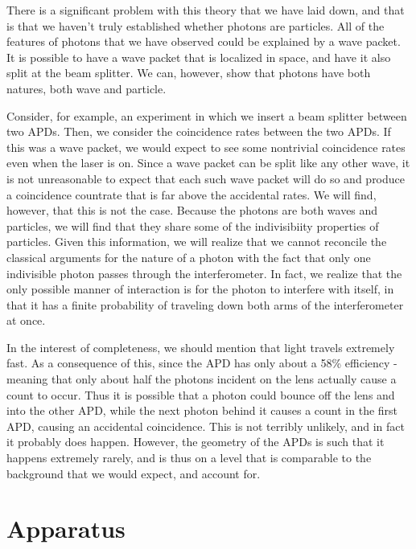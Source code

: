 \documentclass{article}
\begin{document}
	There is a significant problem with this theory that we have laid down, and that is that we haven't truly established whether photons are particles.  All of the features of photons that we have observed could be explained by a wave packet.  It is possible to have a wave packet that is localized in space, and have it also split at the beam splitter.  We can, however, show that photons have both natures, both wave and particle.

	\hspace{.25cm}

	Consider, for example, an experiment in which we insert a beam splitter between two APDs.  Then, we consider the coincidence rates between the two APDs.  If this was a wave packet, we would expect to see some nontrivial coincidence rates even when the laser is on.  Since a wave packet can be split like any other wave, it is not unreasonable to expect that each such wave packet will do so and produce a coincidence countrate that is far above the accidental rates.  We will find, however, that this is not the case.  Because the photons are both waves and particles, we will find that they share some of the indivisibiity properties of particles.  Given this information, we will realize that we cannot reconcile the classical arguments for the nature of a photon with the fact that only one indivisible photon passes through the interferometer.  In fact, we realize that the only possible manner of interaction is for the photon to interfere with itself, in that it has a finite probability of traveling down both arms of the interferometer at once.

	\hspace{.25cm}

	In the interest of completeness, we should mention that light travels extremely fast.  As a consequence of this, since the APD has only about a 58\% efficiency \cite{eff} - meaning that only about half the photons incident on the lens actually cause a count to occur.  Thus it is possible that a photon could bounce off the lens and into the other APD, while the next photon behind it causes a count in the first APD, causing an accidental coincidence.  This is not terribly unlikely, and in fact it probably does happen.  However, the geometry of the APDs is such that it happens extremely rarely, and is thus on a level that is comparable to the background that we would expect, and account for.

\section{Apparatus}
\end{document}
